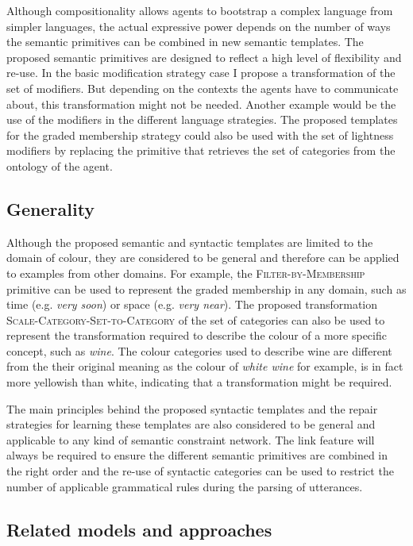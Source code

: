 Although compositionality allows agents to bootstrap a complex
language from simpler languages, the actual expressive power depends
on the number of ways the semantic primitives can be combined in new semantic templates.
The proposed semantic primitives
are designed to reflect a high level of flexibility and re-use. In the
basic modification strategy case I propose a
transformation of the set of modifiers. But depending on the contexts
the agents have to communicate about, this transformation
might not be needed. Another example would be the use of the modifiers
in the different language strategies. The proposed templates for the
graded membership strategy could also be used with the set of
lightness modifiers by replacing the primitive that retrieves the set
of categories from the ontology of the agent.

\subsection{Generality}

Although the proposed semantic and syntactic templates are limited to
the domain of colour, they are considered to be general and therefore can be
applied to examples from other domains. 
For example, the \textsc{Filter-by-Membership} primitive can be used to
represent the graded membership in any domain, such as time
(e.g. \textit{very soon}) or space (e.g. \textit{very near}). The proposed
transformation \textsc{Scale-Category-Set-to-Category} of the set of
categories can also be used to represent the transformation required
to describe the colour of a more specific concept, such as \emph{wine}. The colour
categories used to describe wine are different from the their original
meaning as the colour of \textit{white wine} for example, is in fact more
yellowish than white, indicating that a transformation might be required.

The main principles behind the proposed syntactic templates and the repair
strategies for learning these templates are also considered to be
general and applicable to any kind of semantic constraint
network. The link feature will always be required to ensure the
different semantic primitives are combined in the right order and the
re-use of syntactic categories can be used to restrict the number of applicable
grammatical rules during the parsing of utterances.

\subsection{Related models and approaches}

